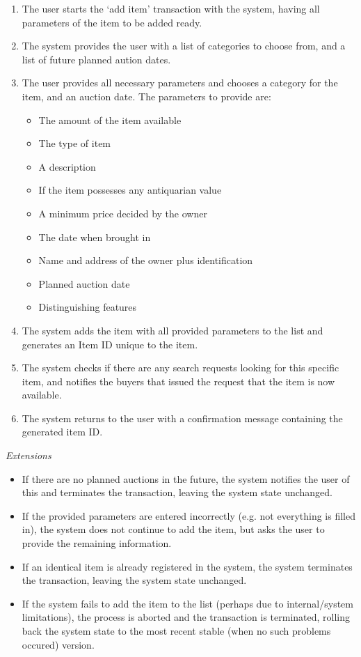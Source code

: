 \begin{enumerate}[noitemsep]
	\item The user starts the `add item' transaction with the system, having all parameters of the item to be added ready.
	\item The system provides the user with a list of categories to choose from, and a list of future planned aution dates.
	\item The user provides all necessary parameters and chooses a category for the item, and an auction date. The parameters to provide are:
	\begin{itemize}[noitemsep]
		\item The amount of the item available
		\item The type of item
		\item A description
		\item If the item possesses any antiquarian value
		\item A minimum price decided by the owner
		\item The date when brought in
		\item Name and address of the owner plus identification
		\item Planned auction date
		\item Distinguishing features
	\end{itemize}
	\item The system adds the item with all provided parameters to the list and generates an Item ID unique to the item.
	\item The system checks if there are any search requests looking for this specific item, and notifies the buyers that issued the request that the item is now available.
	\item The system returns to the user with a confirmation message containing the generated item ID.
\end{enumerate}
\textsl{Extensions}
\begin{itemize}[noitemsep]
	\item If there are no planned auctions in the future, the system notifies the user of this and terminates the transaction, leaving the system state unchanged.
	\item If the provided parameters are entered incorrectly (e.g. not everything is filled in), the system does not continue to add the item, but asks the user to provide the remaining information.
	\item If an identical item is already registered in the system, the system terminates the transaction, leaving the system state unchanged.
	\item If the system fails to add the item to the list (perhaps due to internal/system limitations), the process is aborted and the transaction is terminated, rolling back the system state to the most recent stable (when no such problems occured) version.
\end{itemize}
